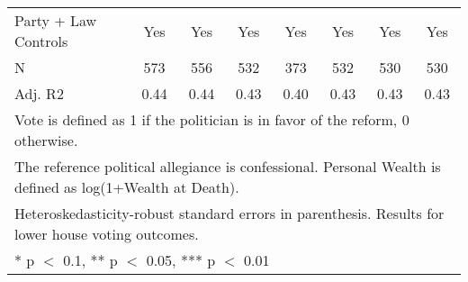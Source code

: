 \begin{table}
\begin{tabular}[t]{lccccccc}
\midrule
Party + Law Controls & Yes & Yes & Yes & Yes & Yes & Yes & Yes\\
N & \num{573} & \num{556} & \num{532} & \num{373} & \num{532} & \num{530} & \num{530}\\
Adj. R2 & \num{0.44} & \num{0.44} & \num{0.43} & \num{0.40} & \num{0.43} & \num{0.43} & \num{0.43}\\
\bottomrule
\multicolumn{8}{l}{\rule{0pt}{1em}Vote is defined as 1 if the politician is in favor of the reform, 0 otherwise.}\\
\multicolumn{8}{l}{\rule{0pt}{1em}The reference political allegiance is confessional. Personal Wealth is defined as log(1+Wealth at Death).}\\
\multicolumn{8}{l}{\rule{0pt}{1em}Heteroskedasticity-robust standard errors in parenthesis. Results for lower house voting outcomes.}\\
\multicolumn{8}{l}{\rule{0pt}{1em}* p $<$ 0.1, ** p $<$ 0.05, *** p $<$ 0.01}\\
\end{tabular}
\end{table}
